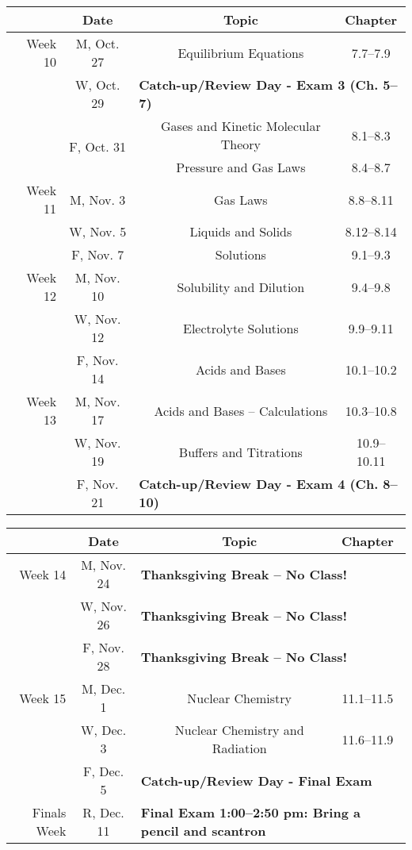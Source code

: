 \documentclass[12pt, letterpaper]{article}
\begin{document}
\begin{tabular}{rcccc}
& Date && Topic & Chapter\\
\midrule
Week 10 & M, Oct. 27&& Equilibrium Equations & 7.7--7.9\\
& W, Oct. 29& \multicolumn{3}{l}{\textbf{Catch-up/Review Day - Exam 3 (Ch. 5--7)}}\\
& \multirow{2}{*}{F, Oct. 31}& & Gases and Kinetic Molecular Theory & 8.1--8.3\\
& & & Pressure and Gas Laws & 8.4--8.7\\
\midrule
Week 11 & M, Nov. 3&& Gas Laws & 8.8--8.11\\
& W, Nov. 5&& Liquids and Solids & 8.12--8.14\\
& F, Nov. 7&& Solutions & 9.1--9.3\\
\midrule
Week 12 & M, Nov. 10&& Solubility and Dilution & 9.4--9.8\\
& W, Nov. 12&& Electrolyte Solutions & 9.9--9.11\\
& F, Nov. 14&& Acids and Bases & 10.1--10.2\\
\midrule
Week 13 & M, Nov. 17&& Acids and Bases -- Calculations & 10.3--10.8\\
& W, Nov. 19&& Buffers and Titrations & 10.9--10.11\\
& F, Nov. 21& \multicolumn{3}{l}{\textbf{Catch-up/Review Day - Exam 4 (Ch. 8--10)}}\\
\end{tabular}

\begin{tabular}{rcccc}
& Date && Topic & Chapter\\
\midrule
Week 14 & M, Nov. 24& \multicolumn{3}{l}{\textbf{Thanksgiving Break -- No Class!}}\\
& W, Nov. 26& \multicolumn{3}{l}{\textbf{Thanksgiving Break -- No Class!}}\\
& F, Nov. 28& \multicolumn{3}{l}{\textbf{Thanksgiving Break -- No Class!}}\\
\midrule
Week 15 & M, Dec. 1&& Nuclear Chemistry & 11.1--11.5\\
& W, Dec. 3&& Nuclear Chemistry and Radiation & 11.6--11.9\\
& F, Dec. 5& \multicolumn{3}{l}{\textbf{Catch-up/Review Day - Final Exam}}\\
\midrule
Finals Week& R, Dec. 11& \multicolumn{3}{l}{\textbf{Final Exam 1:00--2:50 pm: Bring a pencil and scantron}}\\
\end{tabular}
~
\end{document}
